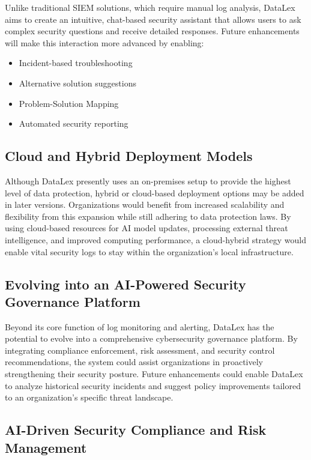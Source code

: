 Unlike traditional SIEM solutions, which require manual log analysis, DataLex aims to create an intuitive, chat-based security assistant that allows users to ask complex security questions and receive detailed responses. Future enhancements will make this interaction more advanced by enabling:

\begin{itemize}
    \item Incident-based troubleshooting
    \item Alternative solution suggestions
    \item Problem-Solution Mapping
    \item Automated security reporting
\end{itemize}

\subsection{Cloud and Hybrid Deployment Models}
\label{subsec_cloud_hybrid_deployment}

Although DataLex presently uses an on-premises setup to provide the highest level of data protection, hybrid or cloud-based deployment options may be added in later versions. Organizations would benefit from increased scalability and flexibility from this expansion while still adhering to data protection laws. By using cloud-based resources for AI model updates, processing external threat intelligence, and improved computing performance, a cloud-hybrid strategy would enable vital security logs to stay within the organization's local infrastructure.

\subsection{Evolving into an AI-Powered Security Governance Platform}
\label{subsec_evolving_security_governance}

Beyond its core function of log monitoring and alerting, DataLex has the potential to evolve into a comprehensive cybersecurity governance platform. By integrating compliance enforcement, risk assessment, and security control recommendations, the system could assist organizations in proactively strengthening their security posture. Future enhancements could enable DataLex to analyze historical security incidents and suggest policy improvements tailored to an organization's specific threat landscape.

\subsection{AI-Driven Security Compliance and Risk Management}
\label{subsec_ai_driven_compliance}

